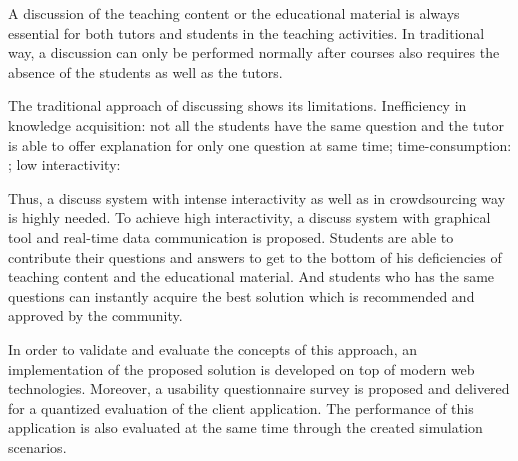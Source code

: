 A discussion of the teaching content or the educational material is always essential for both tutors and students in the teaching activities. In traditional way, a discussion can only be performed normally after courses also requires the absence of the students as well as the tutors.

The traditional approach of discussing shows its limitations. Inefficiency in knowledge acquisition: not all the students have the same question and the tutor is able to offer explanation for only one question at same time; time-consumption: ; low interactivity:

Thus, a discuss system with intense interactivity as well as in crowdsourcing way is highly needed. To achieve high interactivity, a discuss system with graphical tool and real-time data communication is proposed. Students are able to contribute their questions and answers to get to the bottom of his deficiencies of teaching content and the educational material. And students who has the same questions can instantly acquire the best solution  which is recommended and approved by the community.

In order to validate and evaluate the concepts of this approach, an implementation of the proposed solution is developed on top of modern web technologies. Moreover, a usability questionnaire survey is proposed and delivered for a quantized evaluation of the client application. The performance of this application is also evaluated at the same time through the created simulation scenarios.
